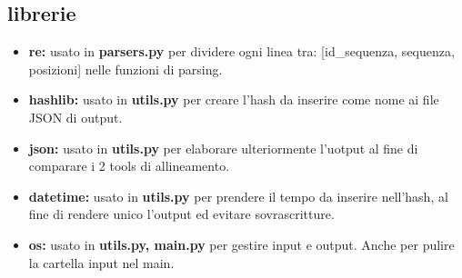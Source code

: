 \documentclass[11pt,italian]{article}
\begin{document}
	\subsection{librerie}
		\begin{itemize}
			\item\textbf{re:} usato in \textbf{parsers.py} per dividere ogni linea tra: [id\_sequenza, sequenza, posizioni] nelle funzioni di parsing.
			\item\textbf{hashlib:} usato in \textbf{utils.py} per creare l'hash da inserire come nome ai file JSON di output.
			\item\textbf{json:} usato in \textbf{utils.py} per elaborare ulteriormente l'uotput al fine di comparare i 2 tools di allineamento.
			\item\textbf{datetime:} usato in \textbf{utils.py} per prendere il tempo da inserire nell'hash, al fine di rendere unico l'output ed evitare sovrascritture.
			\item\textbf{os:} usato in \textbf{utils.py, main.py} per gestire input e output. Anche per pulire la cartella input nel main.
		\end{itemize}
\end{document}
